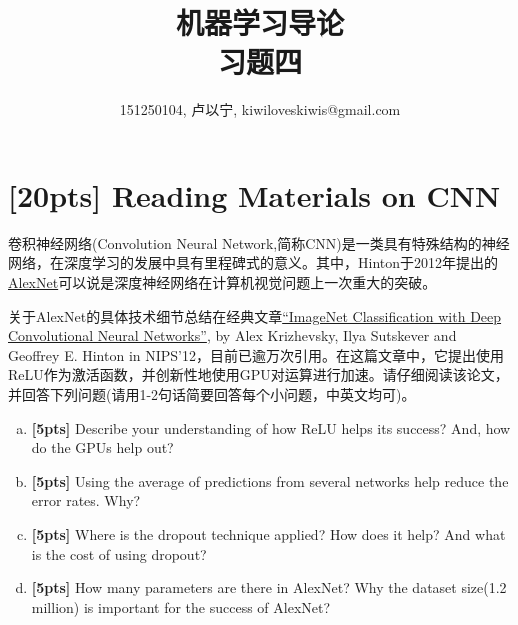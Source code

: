 \documentclass[a4paper,UTF8]{article}
\numberwithin{equation}{section}
\theoremstyle{definition}
\begin{document}
\title{机器学习导论\\
习题四}
\author{151250104, 卢以宁, kiwiloveskiwis@gmail.com}
\maketitle
\section{\textbf{[20pts]} Reading Materials on CNN}
卷积神经网络(Convolution Neural Network,简称CNN)是一类具有特殊结构的神经网络，在深度学习的发展中具有里程碑式的意义。其中，Hinton于2012年提出的\href{https://en.wikipedia.org/wiki/AlexNet}{AlexNet}可以说是深度神经网络在计算机视觉问题上一次重大的突破。

关于AlexNet的具体技术细节总结在经典文章\href{https://papers.nips.cc/paper/4824-imagenet-classification-with-deep-convolutional-neural-networks}{“ImageNet Classification with Deep Convolutional Neural Networks”}, by Alex Krizhevsky, Ilya Sutskever and Geoffrey E. Hinton in NIPS'12，目前已逾万次引用。在这篇文章中，它提出使用ReLU作为激活函数，并创新性地使用GPU对运算进行加速。请仔细阅读该论文，并回答下列问题(请用1-2句话简要回答每个小问题，中英文均可)。

\begin{enumerate}[(a)]
\item \textbf{[5pts]} Describe your understanding of how ReLU helps its success? And, how do the GPUs help out?

\item \textbf{[5pts]} Using the average of predictions from several networks help reduce the error rates. Why?
\item \textbf{[5pts]} Where is the dropout technique applied? How does it help? And what is the cost of using dropout?
\item \textbf{[5pts]} How many parameters are there in AlexNet? Why the dataset size(1.2 million) is important for the success of AlexNet?
\end{enumerate}
\end{document}
